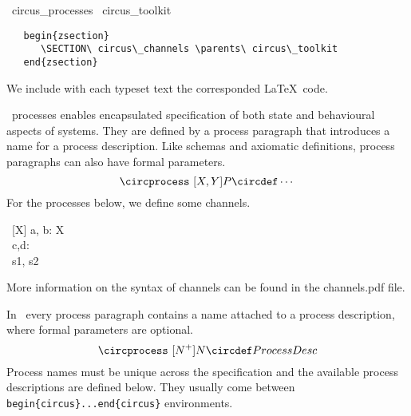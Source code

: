 \documentclass{article}
\begin{document}
\begin{zsection}
  \SECTION\ circus\_processes \parents\ circus\_toolkit
\end{zsection}
%
\begin{verbatim}
   begin{zsection}
      \SECTION\ circus\_channels \parents\ circus\_toolkit
   end{zsection}
\end{verbatim}
%
We include with each typeset text the corresponded \LaTeX\ code.

\Circus\ processes enables encapsulated specification of both state and
behavioural aspects of systems. They are defined by a process paragraph that
introduces a name for a process description. Like schemas and axiomatic
definitions, process paragraphs can also have formal parameters.
%
\[
   \circprocess\ [X, Y] P \circdef \cdots
\]
%
For the processes below, we define some channels.
%
\begin{circus}
   \circchannel\ [X] a, b: X \\
   \circchannel\ c,d: \nat \\
   \circchannel\ s1, s2
\end{circus}
%
More information on the syntax of channels can be found in the \textsf{channels.pdf} file.

In \Circus\ every process paragraph contains a name attached to a process description,
where formal parameters are optional.
%
\[
    \circprocess\ [N^+] N \circdef ProcessDesc
\]
%
Process names must be unique across the specification and the available process descriptions
are defined below. They usually come between \verb'begin{circus}...end{circus}' environments.
\end{document}
